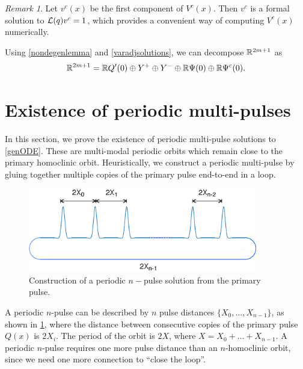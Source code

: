 \documentclass[10pt,reqno]{amsart}
\theoremstyle{plain}
\theoremstyle{definition}
\theoremstyle{remark}
\newtheorem{remark}[theorem]{Remark}
\numberwithin{theorem}{section}
\numberwithin{equation}{section}
\begin{document}
\begin{remark}\label{remark:computeVc}
Let $v^c(x)$ be the first component of $V^c(x)$. Then $v^c$ is a formal solution to $\mathcal{L}(q) v^c = 1$, which provides a convenient way of computing $V^c(x)$ numerically.
\end{remark}

Using \cref{nondegenlemma} and \cref{varadjsolutions}, we can decompose $\mathbb{R}^{2m+1}$ as 
\begin{equation}\label{DSdecomp}
\mathbb{R}^{2m+1} = \mathbb{R} Q'(0) \oplus Y^+ \oplus Y^- \oplus \mathbb{R} \Psi(0) \oplus \mathbb{R} \Psi^c(0).
\end{equation}

\section{Existence of periodic multi-pulses}\label{sec:perexist}

In this section, we prove the existence of periodic multi-pulse solutions to \cref{genODE}. These are multi-modal periodic orbits which remain close to the primary homoclinic orbit. Heuristically, we construct a periodic multi-pulse by gluing together multiple copies of the primary pulse end-to-end in a loop.
\begin{figure}[H]
\begin{center}
\includegraphics[width=10cm]{images/multipulseperiodic}
\end{center}
\caption[Construction of a periodic $n$-pulse solution]{Construction of a periodic $n-$pulse solution from the primary pulse.}
\label{fig:permultipulse}
\end{figure}
A periodic $n$-pulse can be described by $n$ pulse distances $\{X_0, \dots, X_{n-1} \}$, as shown in \cref{fig:permultipulse}, where the distance between consecutive copies of the primary pulse $Q(x)$ is $2 X_i$. The period of the orbit is $2X$, where $X = X_0 + \dots + X_{n-1}$. A periodic $n$-pulse requires one more pulse distance than an $n$-homoclinic orbit, since we need one more connection to ``close the loop''.  
\end{document}
